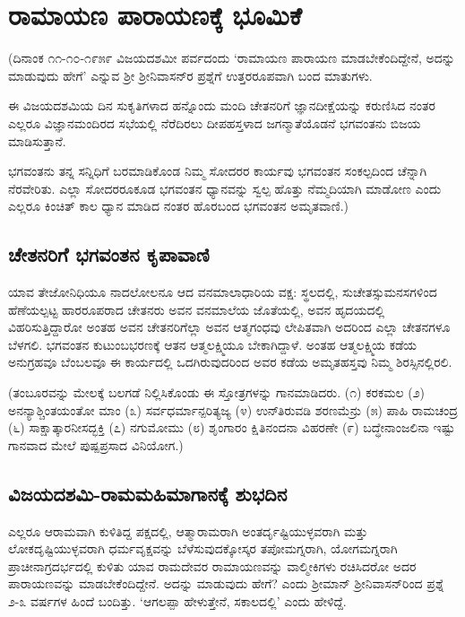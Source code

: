 \chapter{ರಾಮಾಯಣ ಪಾರಾಯಣಕ್ಕೆ ಭೂಮಿಕೆ} 

(ದಿನಾಂಕ ೧೧-೧೦-೧೯೫೯ ವಿಜಯದಶಮೀ ಪರ್ವದಂದು `ರಾಮಾಯಣ ಪಾರಾಯಣ ಮಾಡಬೇಕೆಂದಿದ್ದೇನೆ, ಅದನ್ನು ಮಾಡುವುದು ಹೇಗೆ' ಎನ್ನುವ ಶ್ರೀ ಶ್ರೀನಿವಾಸನ್‍ರ ಪ್ರಶ್ನೆಗೆ ಉತ್ತರರೂಪವಾಗಿ ಬಂದ ಮಾತುಗಳು. 

ಈ ವಿಜಯದಶಮಿಯ ದಿನ ಸುಕೃತಿಗಳಾದ ಹನ್ನೊಂದು ಮಂದಿ ಚೇತನರಿಗೆ ಜ್ಞಾನದೀಕ್ಷೆಯನ್ನು ಕರುಣಿಸಿದ ನಂತರ ಎಲ್ಲರೂ ವಿಜ್ಞಾನಮಂದಿರದ ಸಭೆಯಲ್ಲಿ ನೆರೆದಿರಲು ದೀಪಹಸ್ತಳಾದ ಜಗನ್ಮಾತೆಯೊಡನೆ ಭಗವಂತನು ಬಿಜಯ ಮಾಡಿಸುತ್ತಾನೆ. 

ಭಗವಂತನು ತನ್ನ ಸನ್ನಿಧಿಗೆ ಬರಮಾಡಿಕೊಂಡ ನಿಮ್ಮ ಸೋದರರ ಕಾರ್ಯವು ಭಗವಂತನ ಸಂಕಲ್ಪದಿಂದ ಚೆನ್ನಾಗಿ ನೆರವೇರಿತು. ಎಲ್ಲಾ ಸೋದರರೂಕೂಡ ಭಗವಂತನ ಧ್ಯಾನವನ್ನು ಸ್ವಲ್ಪ ಹೊತ್ತು ನೆಮ್ಮದಿಯಾಗಿ ಮಾಡೋಣ ಎಂದು ಎಲ್ಲರೂ ಕಿಂಚಿತ್‍ ಕಾಲ ಧ್ಯಾನ ಮಾಡಿದ ನಂತರ ಹೊರಬಂದ ಭಗವಂತನ ಅಮೃತವಾಣಿ.) 

\section*{ಚೇತನರಿಗೆ ಭಗವಂತನ ಕೃಪಾವಾಣಿ} 

ಯಾವ ತೇಜೋನಿಧಿಯೂ ನಾದಲೋಲನೂ ಆದ ವನಮಾಲಾಧಾರಿಯ ವಕ್ಷ: ಸ್ಥಲದಲ್ಲಿ, ಸುಚೇತಸ್ಸುಮನಸಗಳಿಂದ ಹೆಣೆಯಲ್ಪಟ್ಟ ಹಾರರೂಪರಾದ ಚೇತನರು ಅವನ ವನಮಾಲೆಯ ಜೊತೆಯಲ್ಲಿ, ಅವನ ಹೃದಯದಲ್ಲಿ ವಿಹರಿಸುತ್ತಿದ್ದಾರೋ ಅಂತಹ ಅವನ ಚೇತನರಿಗೆಲ್ಲಾ ಅವನ ಆತ್ಮಗಂಧವು ಲೇಪಿತವಾಗಿ ಅದರಿಂದ ಎಲ್ಲಾ ಚೇತನಗಳೂ ಬೆಳಗಲಿ. ಭಗವಂತನ ಕುಟುಂಬಭರಣಕ್ಕೆ ಆತನ ಆತ್ಮಲಕ್ಷ್ಮಿಯೂ ಬೇಕಾಗಿದ್ದಾಳೆ. ಅಂತಹ ಆತ್ಮಲಕ್ಷ್ಮಿಯ ಕಡೆಯ ಅನುಗ್ರಹವೂ ಬೆಂಬಲವೂ ಈ ಕಾರ್ಯದಲ್ಲಿ ಒದಗಿರುವುದರಿಂದ ಅವರ ಕಡೆಯ ಅಮೃತಹಸ್ತವು ನಿಮ್ಮ ಶಿರಸ್ಸಿನಲ್ಲಿರಲಿ. 

(ತಂಬೂರವನ್ನು ಮೇಲಕ್ಕೆ ಬಲಗಡೆ ನಿಲ್ಲಿಸಿಕೊಂಡು ಈ ಸ್ತೋತ್ರಗಳನ್ನು ಗಾನಮಾಡಿದರು. (೧) ಕರಕಮಲ (೨) ಅನನ್ಯಾಶ್ಚಿಂತಯಂತೋ ಮಾಂ (೩) ಸರ್ವಧರ್ಮಾನ್ಪರಿತ್ಯಜ್ಯ (೪) ಉನ್‍ತಿರುವಡಿ ಶರಣಮೆನ್ರು (೫) ಪಾಹಿ ರಾಮಚಂದ್ರ (೬) ಸಾಕ್ಷಾತ್ಕಾರನೀಸದ್ಭಕ್ತಿ (೭) ನಗುಮೋಮು (೮) ಶೃಂಗಾರಂ ಕ್ಷಿತಿನಂದನಾ ವಿಹರಣೇ (೯) ಬದ್ಧೇನಾಂಜಲಿನಾ ಇಷ್ಟು ಗಾನವಾದ ಮೇಲೆ ಪುಷ್ಪಪ್ರಸಾದ ವಿನಿಯೋಗ.) 

\section*{ವಿಜಯದಶಮಿ-ರಾಮಮಹಿಮಾಗಾನಕ್ಕೆ ಶುಭದಿನ} 

ಎಲ್ಲರೂ ಆರಾಮವಾಗಿ ಕುಳಿತಿದ್ದ ಪಕ್ಷದಲ್ಲಿ, ಆತ್ಮಾರಾಮರಾಗಿ ಅಂತರ್ದೃಷ್ಟಿಯುಳ್ಳವರಾಗಿ ಮತ್ತು ಲೋಕದೃಷ್ಟಿಯುಳ್ಳವರಾಗಿ ಧರ್ಮವೃಕ್ಷವನ್ನು ಬೆಳೆಸುವುದಕ್ಕೋಸ್ಕರ ತಪೋಮಗ್ನರಾಗಿ, ಯೋಗಮಗ್ನರಾಗಿ ಪ್ರಾಚೀನಾಗ್ರದರ್ಭದಲ್ಲಿ ಕುಳಿತು ಯಾವ ರಾಮದೇವರ ರಾಮಾಯಣವನ್ನು ವಾಲ್ಮೀಕಿಗಳು ರಚಿಸಿದರೋ ಅದರ ಪಾರಾಯಣವನ್ನು ಮಾಡಬೇಕೆಂದಿದ್ದೇನೆ. ಅದನ್ನು ಮಾಡುವುದು ಹೇಗೆ? ಎಂದು ಶ್ರೀಮಾನ್‍ ಶ್ರೀನಿವಾಸನ್‍ರಿಂದ ಪ್ರಶ್ನೆ ೨-೩ ವರ್ಷಗಳ ಹಿಂದೆ ಬಂದಿತ್ತು. `ಆಗಲಪ್ಪಾ ಹೇಳುತ್ತೇನೆ, ಸಕಾಲದಲ್ಲಿ' ಎಂದು ಹೇಳಿದ್ದೆ. 


